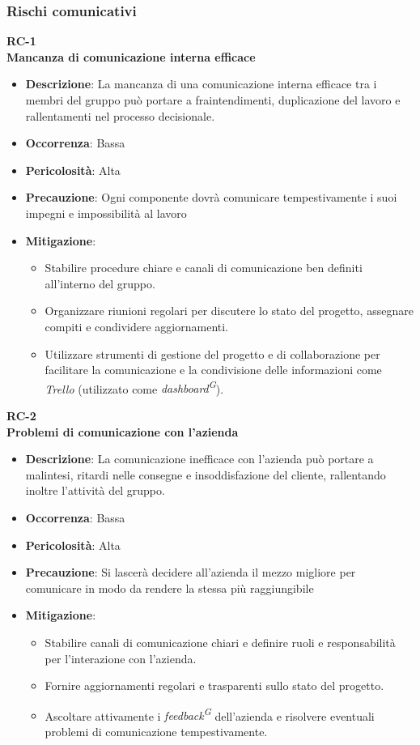 \documentclass[5pt]{article}
\begin{document}
    \subsubsection{Rischi comunicativi}
      \textbf{RC-1}\\
      \textbf{Mancanza di comunicazione interna efficace}
      \begin{itemize}
        \item \textbf{Descrizione}: La mancanza di una comunicazione interna efficace tra i membri del gruppo può portare a fraintendimenti, duplicazione del lavoro e rallentamenti nel processo decisionale.
        \item \textbf{Occorrenza}: Bassa
        \item \textbf{Pericolosità}: Alta
        \item \textbf{Precauzione}: Ogni componente dovrà comunicare tempestivamente i suoi impegni e impossibilità al lavoro
        \item \textbf{Mitigazione}: 
          \begin{itemize}
            \item Stabilire procedure chiare e canali di comunicazione ben definiti all'interno del gruppo.
            \item Organizzare riunioni regolari per discutere lo stato del progetto, assegnare compiti e condividere aggiornamenti.
            \item Utilizzare strumenti di gestione del progetto e di collaborazione per facilitare la comunicazione e 
            la condivisione delle informazioni come \textit{Trello} (utilizzato come \textit{dashboard\textsuperscript{G}}).
          \end{itemize}
      \end{itemize}
      \textbf{RC-2}\\
      \textbf{Problemi di comunicazione con l'azienda}
      \begin{itemize}
        \item \textbf{Descrizione}: La comunicazione inefficace con l'azienda può portare a malintesi, ritardi nelle consegne e insoddisfazione del cliente, rallentando inoltre l'attività del gruppo.
        \item \textbf{Occorrenza}: Bassa
        \item \textbf{Pericolosità}: Alta
        \item \textbf{Precauzione}: Si lascerà decidere all'azienda il mezzo migliore per comunicare in modo da rendere la stessa più raggiungibile
        \item \textbf{Mitigazione}: 
          \begin{itemize}
            \item Stabilire canali di comunicazione chiari e definire ruoli e responsabilità per l'interazione con l'azienda.
            \item Fornire aggiornamenti regolari e trasparenti sullo stato del progetto.
            \item Ascoltare attivamente i \textit{feedback\textsuperscript{G}} dell'azienda e risolvere eventuali problemi di comunicazione tempestivamente.
          \end{itemize}
      \end{itemize}
\end{document}
